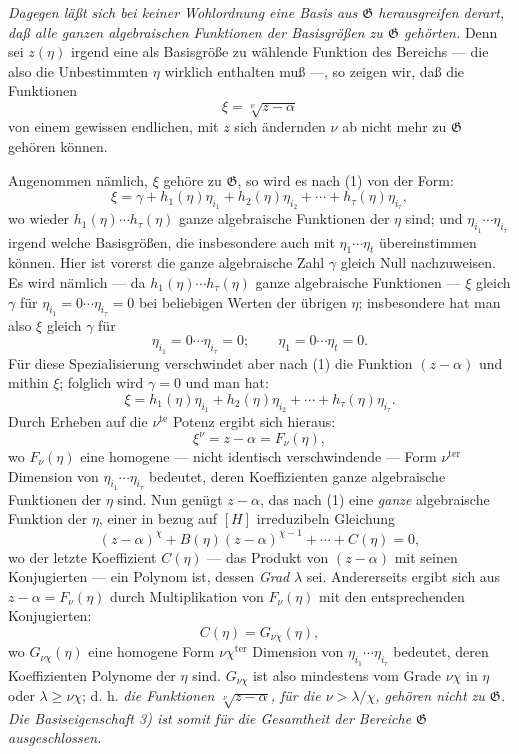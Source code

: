 \emph{Dagegen läßt sich bei keiner Wohlordnung eine Basis aus $\mathfrak G$
herausgreifen derart, daß alle ganzen algebraischen Funktionen der Basisgrößen zu
$\mathfrak G$ gehörten.} Denn sei $z(\eta)$ irgend eine als Basisgröße zu
wählende Funktion des Bereichs --- die also die Unbestimmten $\eta$ wirklich
enthalten muß ---, so zeigen wir, daß die Funktionen
\[
 \xi=\sqrt[\nu]{z-\alpha}
\]
von einem gewissen endlichen, mit $z$ sich ändernden $\nu$ ab nicht mehr zu
$\mathfrak G$ gehören können.

Angenommen nämlich, $\xi$ gehöre zu $\mathfrak G$, so wird es nach (1) von der
Form:
\[
 \xi=\gamma+h_1(\eta)\eta_{i_1}+h_2(\eta)\eta_{i_2}
      +\cdots+h_\tau(\eta)\eta_{i_\tau},
\]
wo wieder $h_1(\eta)\cdots h_\tau(\eta)$ ganze algebraische Funktionen der
$\eta$ sind; und $\eta_{i_1}\cdots\eta_{i_\tau}$ irgend welche Basisgrößen, die
insbesondere auch mit $\eta_1\cdots\eta_t$ übereinstimmen können. Hier ist
vorerst die ganze algebraische Zahl $\gamma$ gleich Null nachzuweisen. Es wird
nämlich --- da $h_1(\eta)\cdots h_\tau(\eta)$ ganze algebraische Funktionen ---
$\xi$ gleich $\gamma$ für
$\eta_{i_1}=0\cdots\eta_{i_\tau}=0$ bei beliebigen Werten der übrigen $\eta$;
insbesondere hat man also $\xi$ gleich $\gamma$ für
\[
 \eta_{i_1}=0\cdots \eta_{i_\tau}=0; \qquad
 \eta_1=0\cdots \eta_t=0.
\]
Für diese Spezialisierung verschwindet aber nach (1) die Funktion $(z-\alpha)$
und mithin $\xi$; folglich wird $\gamma=0$ und man hat:
\[
 \xi=h_1(\eta)\eta_{i_1}+h_2(\eta)\eta_{i_2}
      +\cdots+h_\tau(\eta)\eta_{i_\tau}.
\]
Durch Erheben auf die $\nu^{\text{te}}$ Potenz ergibt sich hieraus:
\[
 \xi^\nu=z-\alpha=F_\nu(\eta),
\]
wo $F_\nu(\eta)$ eine homogene --- nicht identisch verschwindende --- Form
$\nu^{\text{ter}}$ Dimension von $\eta_{i_1}\cdots\eta_{i_\tau}$ bedeutet, deren
Koeffizienten ganze algebraische Funktionen der $\eta$ sind. Nun genügt
$z-\alpha$, das nach (1) eine \emph{ganze} algebraische Funktion der $\eta$,
einer in bezug auf $[H]$ irreduzibeln Gleichung
\[
 (z-\alpha)^\chi+B(\eta)(z-\alpha)^{\chi-1}+\cdots+C(\eta)=0,
\]
wo der letzte Koeffizient $C(\eta)$ --- das Produkt von $(z-\alpha)$ mit seinen
Konjugierten --- ein Polynom ist, dessen \emph{Grad} $\lambda$ sei. Andererseits
ergibt sich aus $z-\alpha=F_\nu(\eta)$ durch Multiplikation von $F_\nu(\eta)$
mit den entsprechenden Konjugierten:
\[
 C(\eta)=G_{\nu\chi}(\eta),
\]
wo $G_{\nu\chi}(\eta)$ eine homogene Form $\nu\chi^{\text{ter}}$ Dimension von
$\eta_{i_1}\cdots\eta_{i_\tau}$ bedeutet, deren Koeffizienten Polynome der
$\eta$ sind. $G_{\nu\chi}$ ist also mindestens vom Grade $\nu\chi$ in $\eta$
oder $\lambda\geq\nu\chi$; d. h. \emph{die Funktionen
$\sqrt[\nu]{z-\alpha}$, für die $\nu>\lambda/\chi$, gehören nicht zu
$\mathfrak G$. Die Basiseigenschaft 3) ist somit für die Gesamtheit der
Bereiche $\mathfrak G$ ausgeschlossen.}

